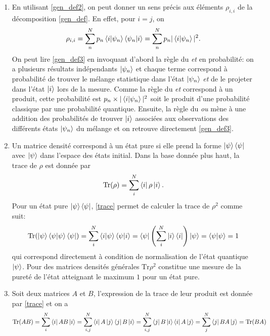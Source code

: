 \begin{enumerate}
    \item En utilisant \eqref{gen_def2}, on peut donner un sens précis aux éléments $\rho_{i, i}$ de la décomposition \eqref{gen_def}. En effet, pour $i=j$, on 
    \begin{align}
        \rho_{i, i} = \sum_n^{N} p_n\bra{i}\ket{\psi_n}\bra{\psi_n}\ket{i}=\sum_n^{N} p_n|\bra{i}\ket{\psi_n}|^2. \label{gen_def3}
    \end{align}  
    On peut lire \eqref{gen_def3} en invoquant d'abord la règle du \textit{et} en probabilité: on a plusieurs résultats indépendants $\ket{\psi_n}$ et chaque terme correspond à probabilité de trouver le mélange statistique dans l'état $\ket{\psi_n}$ \textit{et} de le projeter dans l'état $\ket{i}$ lors de la mesure. Comme la règle du \textit{et} correspond à un produit, cette probabilité est $p_n \times |\bra{i}\ket{\psi_n}|^2$ soit le produit d'une probabilité classique par une probabilité quantique. Ensuite, la règle du \textit{ou} mène à une addition des probabilités de trouver $\ket{i}$ associées aux observations des différents états $\ket{\psi_n}$ du mélange et on retrouve directement \eqref{gen_def3}.
    \item Un matrice densité correspond à un état pure si elle prend la forme $\ket{\psi}\bra{\psi}$ avec $\ket{\psi}$ dans l'espace des états initial. Dans la base donnée plus haut, la trace de $\rho$ est donnée par 
    \begin{align}
        \text{Tr}(\rho) = \sum_{i}^N \bra{i}\rho \ket{i}.\label{trace}
    \end{align}
    Pour un état pure $\ket{\psi}\bra{\psi}$, \eqref{trace} permet de calculer la trace de $\rho^2$ comme suit:
    \begin{align}
        \text{Tr}(\ket{\psi}\bra{\psi}\ket{\psi}\bra{\psi}) = \sum_{i}^N \bra{i}\ket{\psi}\bra{\psi} \ket{i} = \bra{\psi}\left(\sum_{i}^N  \ket{i}\bra{i}\right)\ket{\psi} = \bra{\psi} \ket{\psi} = 1\label{trace2}
    \end{align}
    qui correspond directement à condition de normalisation de l'état quantique $\ket{\psi}$. Pour des matrices densités générales $\mathrm{Tr}\rho^2$ constitue une mesure de la pureté de l'état atteignant le maximum $1$ pour un état pure. 
    \item Soit deux matrices $A$ et $B$, l'expression de la trace de leur produit est donnée par \eqref{trace} et on a 
    \begin{align}
        \text{Tr}(AB) = \sum_{i}^N \bra{i}AB\ket{i} = \sum_{i,j}^N \bra{i}A\ket{j}\bra{j}B\ket{i} = \sum_{i,j}^N \bra{j}B\ket{i}\bra{i}A\ket{j} = \sum_{j}^N \bra{j}BA\ket{j} = \text{Tr}(BA)\label{trace3}

\end{align}
\end{enumerate}
